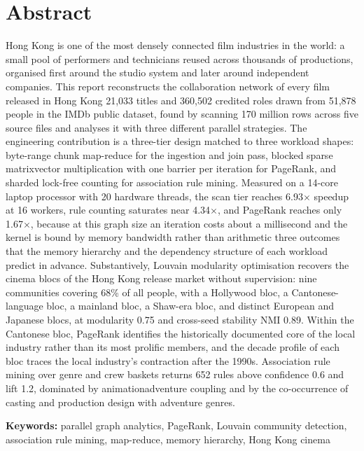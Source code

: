 
\section{Abstract}

Hong Kong is one of the most densely connected film industries in the world: a small pool of performers and technicians reused across thousands of productions, organised first around the studio system and later around independent companies. This report reconstructs the collaboration network of every film released in Hong Kong \textemdash{} 21,033 titles and 360,502 credited roles drawn from 51,878 people in the IMDb public dataset, found by scanning 170 million rows across five source files \textemdash{} and analyses it with three different parallel strategies. The engineering contribution is a three-tier design matched to three workload shapes: byte-range chunk map-reduce for the ingestion and join pass, blocked sparse matrix\textendash{}vector multiplication with one barrier per iteration for PageRank, and sharded lock-free counting for association rule mining. Measured on a 14-core laptop processor with 20 hardware threads, the scan tier reaches 6.93$\times$ speedup at 16 workers, rule counting saturates near 4.34$\times$, and PageRank reaches only 1.67$\times$, because at this graph size an iteration costs about a millisecond and the kernel is bound by memory bandwidth rather than arithmetic \textemdash{} three outcomes that the memory hierarchy and the dependency structure of each workload predict in advance. Substantively, Louvain modularity optimisation recovers the cinema blocs of the Hong Kong release market without supervision: nine communities covering 68\% of all people, with a Hollywood bloc, a Cantonese-language bloc, a mainland bloc, a Shaw-era bloc, and distinct European and Japanese blocs, at modularity 0.75 and cross-seed stability NMI 0.89. Within the Cantonese bloc, PageRank identifies the historically documented core of the local industry rather than its most prolific members, and the decade profile of each bloc traces the local industry's contraction after the 1990s. Association rule mining over genre and crew baskets returns 652 rules above confidence 0.6 and lift 1.2, dominated by animation\textendash{}adventure coupling and by the co-occurrence of casting and production design with adventure genres.

\textbf{Keywords:} parallel graph analytics, PageRank, Louvain community detection, association rule mining, map-reduce, memory hierarchy, Hong Kong cinema
